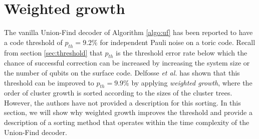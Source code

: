 \section{Weighted growth}\label{sec:bucketclustersort}
The vanilla Union-Find decoder of Algorithm \ref{algo:uf} has been reported to have a code threshold of $p_{th}=9.2\%$ for independent Pauli noise \cite{delfosse2017almost} on a toric code. Recall from section \ref{sec:threshold} that $p_{th}$ is the threshold error rate below which the chance of successful correction can be increased by increasing the system size or the number of qubits on the surface code. Delfosse \emph{et al.} has shown that this threshold can be improved to $p_{th}=9.9\%$ by applying \emph{weighted growth}, where the order of cluster growth is sorted according to the sizes of the cluster trees. However, the authors have not provided a description for this sorting. In this section, we will show why weighted growth improves the threshold and provide a description of a sorting method that operates within the time complexity of the Union-Find decoder. 



